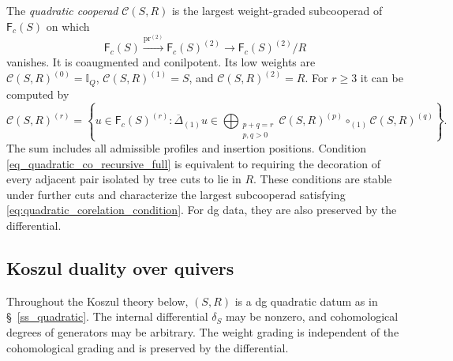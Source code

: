\documentclass[11pt,letterpaper]{article}
\numberwithin{equation}{section}
\theoremstyle{plain}
\theoremstyle{definition}
\theoremstyle{remark}
\newcommand{\p}{\mathfrak p}
\begin{document}
The \textit{quadratic cooperad} $\mathscr C(S,R)$ is the largest weight-graded subcooperad of $\mathsf F_c(S)$ on which
\begin{equation}\label{eq:quadratic_corelation_condition}
\mathsf F_c(S)\xrightarrow{\operatorname{pr}^{(2)}}\mathsf F_c(S)^{(2)}
 \longrightarrow\mathsf F_c(S)^{(2)}/R
\end{equation}
vanishes. It is coaugmented and conilpotent. Its low weights are $\mathscr C(S,R)^{(0)}=\mathbb I_Q$, $\mathscr C(S,R)^{(1)}=S$, and $\mathscr C(S,R)^{(2)}=R$.
For $r\geq3$ it can be computed by
\begin{equation}\label{eq_quadratic_co_recursive_full}
\mathscr C(S,R)^{(r)}=
\left\{u\in\mathsf F_c(S)^{(r)}:
\overline\Delta_{(1)}u\in
\bigoplus_{\substack{p+q=r\\p,q>0}}
\mathscr C(S,R)^{(p)}\circ_{(1)}\mathscr C(S,R)^{(q)}\right\}.
\end{equation}
The sum includes all admissible profiles and insertion positions. Condition \eqref{eq_quadratic_co_recursive_full} is equivalent to requiring the decoration of every adjacent pair isolated by tree cuts to lie in $R$. These conditions are stable under further cuts and characterize the largest subcooperad satisfying \eqref{eq:quadratic_corelation_condition}. For dg data, they are also preserved by the differential.

\subsection{Koszul duality over quivers}
\label{ss_koszul_duality}
Throughout the Koszul theory below, $(S,R)$ is a dg quadratic datum as in \S~\ref{ss_quadratic}. The internal differential $\delta_S$ may be nonzero, and cohomological degrees of generators may be arbitrary. The weight grading is independent of the cohomological grading and is preserved by the differential.
\end{document}
